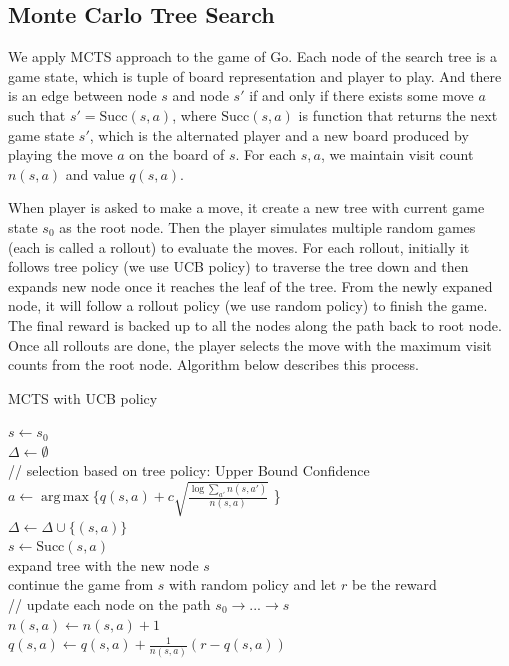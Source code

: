 \documentclass{article}
\DeclareMathOperator*{\argmax}{arg\,max}
\begin{document}
\subsection{Monte Carlo Tree Search}
\label{sec:mcts}
We apply MCTS approach to the game of Go. Each node of the search tree is a game state, which is tuple of board representation and player to play. And there is an edge between node $s$ and node $s'$ if and only if there exists some move $a$ such that $s' = \text{Succ}(s, a)$, where $\text{Succ}(s,a)$ is function that returns the next game state $s'$, which is the alternated player and a new board produced by playing the move $a$ on the board of $s$. For each  $s, a$, we maintain visit count $n(s,a)$ and value $q(s,a)$. 

When player is asked to make a move, it create a new tree with current game state $s_0$ as the root node. Then the player simulates multiple random games (each is called a rollout) to evaluate the moves. For each rollout, initially it follows tree policy (we use UCB policy) to traverse the tree down and then expands new node once it reaches the leaf of the tree. From the newly expaned node, it will follow a rollout policy (we use random policy) to finish the game. The final reward is backed up to all the nodes along the path back to root node. Once all rollouts are done, the player selects the move with the maximum visit counts from the root node. Algorithm below describes this process.

\begin{algorithm} 
  \label{algo:mcts}
  \DontPrintSemicolon
  \caption{MCTS with UCB policy}
   {
    $ s \gets s_0 $ \\
    $ \Delta \gets \emptyset$ \\
    // selection based on tree policy: Upper Bound Confidence \\
     {
      $a  \gets \argmax \{ q(s, a) + c \sqrt{\frac{\log \sum_{a'}n(s, a')}{n(s,a)}}$ \}\\
      $\Delta \gets \Delta \cup \{(s, a)\}  $ \\
      $s \gets \text{Succ}(s, a) $\\
    }
    expand tree with the new node $s$ \\
    continue the game from $s$ with random policy and let $r$ be the reward \\
    // update each node on the path $s_0 \rightarrow ... \rightarrow s$ \\
     {
      $ n(s, a) \gets n(s,a) + 1 $ \\
      $ q(s, a) \gets q(s,a) +  \frac{1}{n(s,a)} (r - q(s,a))$ \\
    }
  }
  \Return{$\argmax_{a} q(s_0, a) $}
\end{algorithm}
\end{document}
